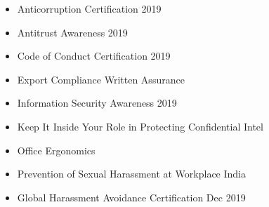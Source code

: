 \begin{itemize}
	\item Anticorruption Certification 2019
	\item Antitrust Awareness 2019
	\item Code of Conduct Certification 2019
	\item Export Compliance Written Assurance
	\item Information Security Awareness 2019
	\item Keep It Inside Your Role in Protecting Confidential Intel
	\item Office Ergonomics
	\item Prevention of Sexual Harassment at Workplace India
	\item Global Harassment Avoidance Certification Dec 2019
\end{itemize}